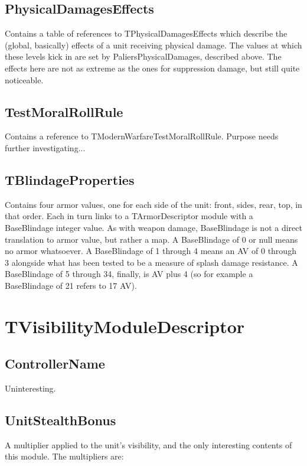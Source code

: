 \documentclass{article}
\begin{document}
\subsection{PhysicalDamagesEffects}

Contains a table of references to TPhysicalDamagesEffects which describe the (global, basically) effects of a unit receiving physical damage. The values at which these levels kick in are set by PaliersPhysicalDamages, described above. The effects here are not as extreme as the ones for suppression damage, but still quite noticeable.

\subsection{TestMoralRollRule}

Contains a reference to TModernWarfareTestMoralRollRule. Purpose needs further investigating...

\subsection{TBlindageProperties}

Contains four armor values, one for each side of the unit: front, sides, rear, top, in that order. Each in turn links to a TArmorDescriptor module with a BaseBlindage integer value. As with weapon damage, BaseBlindage is not a direct translation to armor value, but rather a map. A BaseBlindage of 0 or null means no armor whatsoever. A BaseBlindage of 1 through 4 means an AV of 0 through 3 alongside what has been tested to be a measure of splash damage resistance. A BaseBlindage of 5 through 34, finally, is AV plus 4 (so for example a BaseBlindage of 21 refers to 17 AV).

\section{TVisibilityModuleDescriptor}

\subsection{ControllerName}

Uninteresting.

\subsection{UnitStealthBonus}

A multiplier applied to the unit's visibility, and the only interesting contents of this module. The multipliers are:
\end{document}
